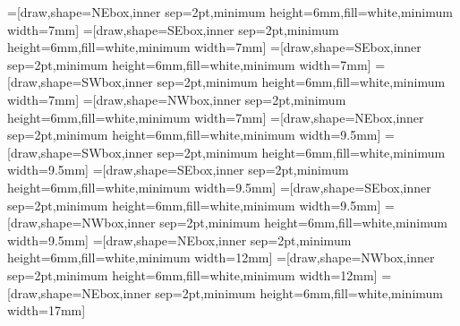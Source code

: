 =[draw,shape=NEbox,inner sep=2pt,minimum height=6mm,fill=white,minimum width=7mm]
=[draw,shape=SEbox,inner sep=2pt,minimum height=6mm,fill=white,minimum width=7mm]
=[draw,shape=SEbox,inner sep=2pt,minimum height=6mm,fill=white,minimum width=7mm]
=[draw,shape=SWbox,inner sep=2pt,minimum height=6mm,fill=white,minimum width=7mm]
=[draw,shape=NWbox,inner sep=2pt,minimum height=6mm,fill=white,minimum width=7mm]
=[draw,shape=NEbox,inner sep=2pt,minimum height=6mm,fill=white,minimum width=9.5mm]
=[draw,shape=SWbox,inner sep=2pt,minimum height=6mm,fill=white,minimum width=9.5mm]
=[draw,shape=SEbox,inner sep=2pt,minimum height=6mm,fill=white,minimum width=9.5mm]
=[draw,shape=SEbox,inner sep=2pt,minimum height=6mm,fill=white,minimum width=9.5mm]
=[draw,shape=NWbox,inner sep=2pt,minimum height=6mm,fill=white,minimum width=9.5mm]
=[draw,shape=NEbox,inner sep=2pt,minimum height=6mm,fill=white,minimum width=12mm]
=[draw,shape=NWbox,inner sep=2pt,minimum height=6mm,fill=white,minimum width=12mm]
=[draw,shape=NEbox,inner sep=2pt,minimum height=6mm,fill=white,minimum width=17mm]

